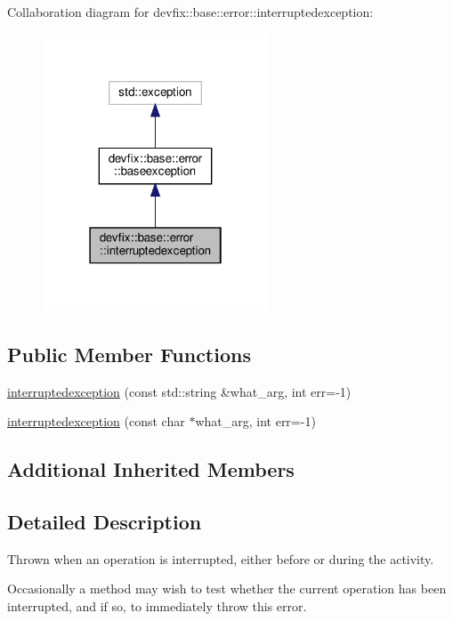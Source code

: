 Collaboration diagram for devfix\+:\+:base\+:\+:error\+:\+:interruptedexception\+:
\nopagebreak
\begin{figure}[H]
\begin{center}
\leavevmode
\includegraphics[width=190pt]{structdevfix_1_1base_1_1error_1_1interruptedexception__coll__graph}
\end{center}
\end{figure}
\subsection*{Public Member Functions}
\begin{DoxyCompactItemize}
\item 
\hyperlink{structdevfix_1_1base_1_1error_1_1interruptedexception_a9b2d1244ef3e3029d231be8b84fa4c16}{interruptedexception} (const std\+::string \&what\+\_\+arg, int err=-\/1)
\item 
\hyperlink{structdevfix_1_1base_1_1error_1_1interruptedexception_a244a67233ab2b7be511706d8398ed860}{interruptedexception} (const char $\ast$what\+\_\+arg, int err=-\/1)
\end{DoxyCompactItemize}
\subsection*{Additional Inherited Members}


\subsection{Detailed Description}
Thrown when an operation is interrupted, either before or during the activity. 

Occasionally a method may wish to test whether the current operation has been interrupted, and if so, to immediately throw this error. 

